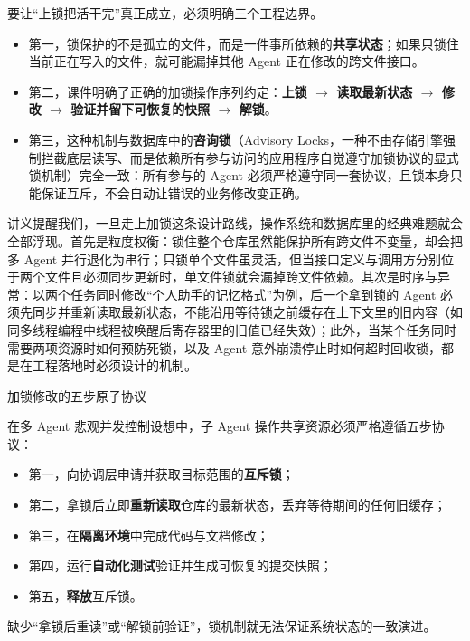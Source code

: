 \documentclass[UTF8,a4paper,11pt,fontset=fandol]{ctexart}
\begin{document}
要让“上锁把活干完”真正成立，必须明确三个工程边界。

\begin{itemize}
\item 第一，锁保护的不是孤立的文件，而是一件事所依赖的\textbf{共享状态}；如果只锁住当前正在写入的文件，就可能漏掉其他 Agent 正在修改的跨文件接口。

\item 第二，课件明确了正确的加锁操作序列约定：\textbf{上锁 \ensuremath{\rightarrow} 读取最新状态 \ensuremath{\rightarrow} 修改 \ensuremath{\rightarrow} 验证并留下可恢复的快照 \ensuremath{\rightarrow} 解锁}。

\item 第三，这种机制与数据库中的\textbf{咨询锁}（Advisory Locks，一种不由存储引擎强制拦截底层读写、而是依赖所有参与访问的应用程序自觉遵守加锁协议的显式锁机制）完全一致：所有参与的 Agent 必须严格遵守同一套协议，且锁本身只能保证互斥，不会自动让错误的业务修改变正确。
\end{itemize}

讲义提醒我们，一旦走上加锁这条设计路线，操作系统和数据库里的经典难题就会全部浮现。首先是粒度权衡：锁住整个仓库虽然能保护所有跨文件不变量，却会把多 Agent 并行退化为串行；只锁单个文件虽灵活，但当接口定义与调用方分别位于两个文件且必须同步更新时，单文件锁就会漏掉跨文件依赖。其次是时序与异常：以两个任务同时修改“个人助手的记忆格式”为例，后一个拿到锁的 Agent 必须先同步并重新读取最新状态，不能沿用等待锁之前缓存在上下文里的旧内容（如同多线程编程中线程被唤醒后寄存器里的旧值已经失效）；此外，当某个任务同时需要两项资源时如何预防死锁，以及 Agent 意外崩溃停止时如何超时回收锁，都是在工程落地时必须设计的机制。

\begin{importantbox}{加锁修改的五步原子协议}

在多 Agent 悲观并发控制设想中，子 Agent 操作共享资源必须严格遵循五步协议：

\begin{itemize}
\item 第一，向协调层申请并获取目标范围的\textbf{互斥锁}；

\item 第二，拿锁后立即\textbf{重新读取}仓库的最新状态，丢弃等待期间的任何旧缓存；

\item 第三，在\textbf{隔离环境}中完成代码与文档修改；

\item 第四，运行\textbf{自动化测试}验证并生成可恢复的提交快照；

\item 第五，\textbf{释放}互斥锁。

\end{itemize}
缺少“拿锁后重读”或“解锁前验证”，锁机制就无法保证系统状态的一致演进。

\end{importantbox}
\end{document}
